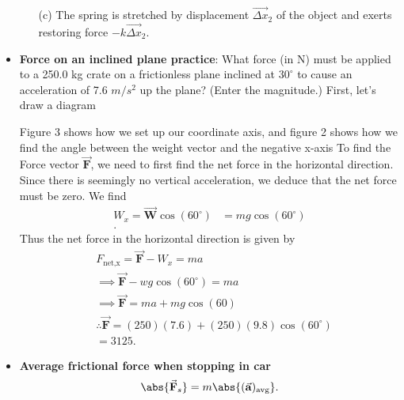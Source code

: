 \documentclass{report}
\begin{document}
\begin{itemize}
\begin{enumerate}
                \item[(c)] The spring is stretched by displacement $\vec{\Delta x}_2$ of the object and exerts restoring force $-k\vec{\Delta x}_2$.
            \end{enumerate}
        \item \textbf{Force on an inclined plane practice}: What force (in N) must be applied to a 250.0 kg crate on a frictionless plane inclined at $30^{\circ}$ to cause an acceleration of 7.6 $m/s^{2}$ up the plane? (Enter the magnitude.)
            \bigbreak \noindent 
            First, let's draw a diagram
            \bigbreak \noindent 
    \begin{figure}[ht]
        \centering
        \label{fig:dagz}
    \end{figure}
    \bigbreak \noindent 
    Figure 3 shows how we set up our coordinate axis, and figure 2 shows how we find the angle between the weight vector and the negative x-axis
    \bigbreak \noindent 
    To find the Force vector $\vec{\mathbf{F}}$, we need to first find the net force in the horizontal direction. Since there is seemingly no vertical acceleration, we deduce that the net force must be zero. We find 
    \begin{align*}
        W_{x} = \vec{\mathbf{W}}\cos{\left(60^{\circ}\right)} &= mg\cos{\left(60^{\circ}\right)} \\
    .\end{align*}
    Thus the net force in the horizontal direction is given by
    \begin{align*}
        &F_{\text{net,x}} = \vec{\mathbf{F}} - W_{x} = ma \\
        &\implies \vec{\mathbf{F}} - wg\cos{\left(60^{\circ}\right)} = ma \\
        &\implies \vec{\mathbf{F}} = ma + mg\cos{\left(60\right)} \\
        &\therefore \vec{\mathbf{F}} = (250)(7.6) + (250)(9.8)\cos{\left(60^{\circ}\right)} \\
        &=3125
    .\end{align*}
\item \textbf{Average frictional force when stopping in car}
    \begin{align*}
        \abs{\vec{\mathbf{F}}_{s}} = m\abs{(\vec{\mathbf{a}})_{\text{avg}}}
    .\end{align*}

    \end{itemize}

    \pagebreak 
\end{document}
